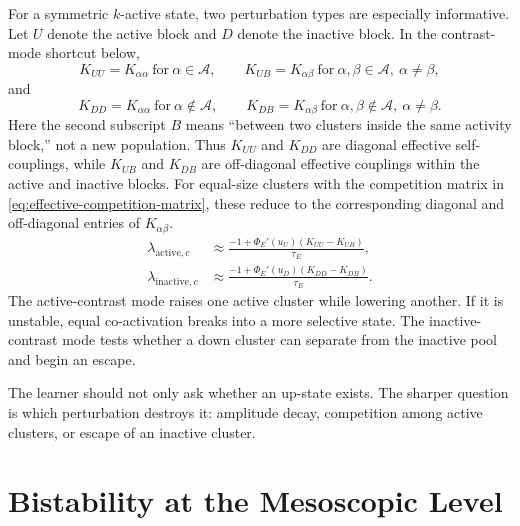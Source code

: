 For a symmetric $k$-active state, two perturbation types are especially informative. Let $U$ denote the active block and $D$ denote the inactive block. In the contrast-mode shortcut below,
%
\begin{equation}
  K_{UU}=K_{\alpha\alpha}\ \text{for}\ \alpha\in\mathcal{A},
  \qquad
  K_{UB}=K_{\alpha\beta}\ \text{for}\ \alpha,\beta\in\mathcal{A},\ \alpha\ne\beta,
  \label{eq:active-block-couplings}
\end{equation}
%
and
%
\begin{equation}
  K_{DD}=K_{\alpha\alpha}\ \text{for}\ \alpha\notin\mathcal{A},
  \qquad
  K_{DB}=K_{\alpha\beta}\ \text{for}\ \alpha,\beta\notin\mathcal{A},\ \alpha\ne\beta.
  \label{eq:inactive-block-couplings}
\end{equation}
%
Here the second subscript $B$ means ``between two clusters inside the same activity block,'' not a new population. Thus $K_{UU}$ and $K_{DD}$ are diagonal effective self-couplings, while $K_{UB}$ and $K_{DB}$ are off-diagonal effective couplings within the active and inactive blocks. For equal-size clusters with the competition matrix in \eqref{eq:effective-competition-matrix}, these reduce to the corresponding diagonal and off-diagonal entries of $K_{\alpha\beta}$.
%
\begin{align}
  \lambda_{\mathrm{active},c}
  &\approx
  \frac{-1+\Phi_E'(u_U)(K_{UU}-K_{UB})}{\tau_E},
  \label{eq:active-contrast-eigenvalue}\\
  \lambda_{\mathrm{inactive},c}
  &\approx
  \frac{-1+\Phi_E'(u_D)(K_{DD}-K_{DB})}{\tau_E}.
  \label{eq:inactive-contrast-eigenvalue}
\end{align}
%
The active-contrast mode raises one active cluster while lowering another. If it is unstable, equal co-activation breaks into a more selective state. The inactive-contrast mode tests whether a down cluster can separate from the inactive pool and begin an escape.

The learner should not only ask whether an up-state exists. The sharper question is which perturbation destroys it: amplitude decay, competition among active clusters, or escape of an inactive cluster.

\section{Bistability at the Mesoscopic Level}
\label{sec:bistability-at-mesoscopic-level}

